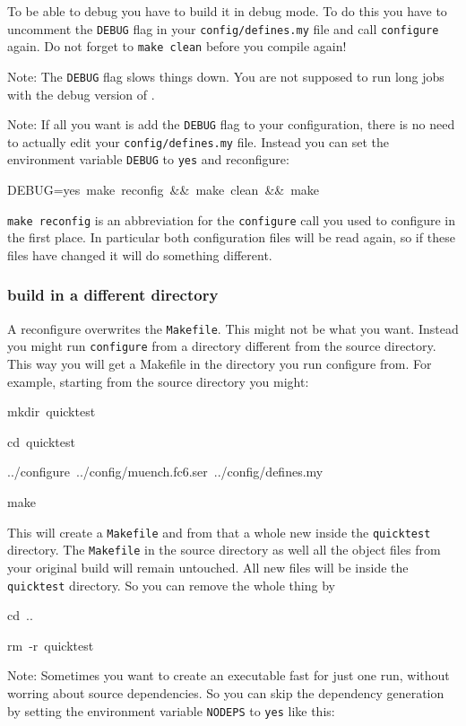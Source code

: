 To be able to debug \ccarat{} you have to build it in debug mode.
To do this you have to uncomment the \texttt{DEBUG} flag in your \texttt{config/defines.my}
file and call \texttt{configure} again. Do not forget to \texttt{make
clean} before you compile again!

Note: The \texttt{DEBUG} flag slows things down. You are not supposed
to run long jobs with the debug version of \ccarat{}.

Note: If all you want is add the \texttt{DEBUG} flag to your configuration,
there is no need to actually edit your \texttt{config/defines.my}
file. Instead you can set the environment variable \texttt{DEBUG}
to \texttt{yes} and reconfigure:

\begin{lyxcode}
DEBUG=yes~make~reconfig~\&\&~make~clean~\&\&~make
\end{lyxcode}
\texttt{make reconfig} is an abbreviation for the \texttt{configure}
call you used to configure in the first place. In particular both
configuration files will be read again, so if these files have changed
it will do something different.


\subsubsection{build in a different directory}

A \ccarat{} reconfigure overwrites the \texttt{Makefile}. This might
not be what you want. Instead you might run \texttt{configure} from
a directory different from the \ccarat{} source directory. This way
you will get a Makefile in the directory you run configure from. For
example, starting from the \ccarat{} source directory you might:

\begin{lyxcode}
mkdir~quicktest

cd~quicktest

../configure~../config/muench.fc6.ser~../config/defines.my

make
\end{lyxcode}
This will create a \texttt{Makefile} and from that a whole new \ccarat{}
inside the \texttt{quicktest} directory. The \texttt{Makefile} in
the source directory as well all the object files from your original
build will remain untouched. All new files will be inside the \texttt{quicktest}
directory. So you can remove the whole thing by

\begin{lyxcode}
cd~..

rm~-r~quicktest
\end{lyxcode}
Note: Sometimes you want to create an executable fast for just one
run, without worring about source dependencies. So you can skip the
dependency generation by setting the environment variable \texttt{NODEPS}
to \texttt{yes} like this:

